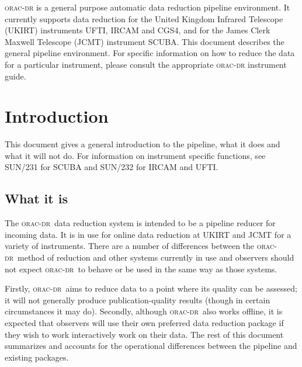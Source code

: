 \documentclass[twoside,11pt]{article}
\newcommand{\stardocinitials}  {SUN}
\newcommand{\stardocnumber}    {230.2}
\newcommand{\stardocabstract}  {\textsc{orac-dr} is a general purpose
automatic data reduction pipeline environment. It currently supports data
reduction for the United Kingdom Infrared Telescope (UKIRT) instruments UFTI,
 IRCAM and CGS4, and for the James Clerk Maxwell Telescope (JCMT) instrument
SCUBA. This document describes the general pipeline environment. For specific
information on how to reduce the data for a particular instrument, please
consult the appropriate \textsc{orac-dr} instrument guide.}
\newcommand{\stardocname}{\stardocinitials /\stardocnumber}
\newenvironment{latexonly}{}{}
\renewcommand{\_}{\texttt{\symbol{95}}}
\newcommand{\oracdr}{\textsc{orac-dr}}
\renewcommand{\thepage}{\roman{page}}
\begin{document}
\stardocabstract
  \newpage
  \begin{latexonly}
    \setlength{\parskip}{0mm}
    \tableofcontents
    \setlength{\parskip}{\medskipamount}
    \markboth{\stardocname}{\stardocname}
  \end{latexonly}
\cleardoublepage
\renewcommand{\thepage}{\arabic{page}}
\setcounter{page}{1}


\section{Introduction\label{Introduction_to_ORAC-DR}}

This document gives a general introduction to the pipeline, what it
does and what it will not do. For information on instrument
specific functions, see SUN/231 for SCUBA and SUN/232 for IRCAM and UFTI.

\subsection*{What it is\label{Introduction_to_ORAC-DR_What_it_is}}

The \oracdr\ data reduction system is intended to be a pipeline reducer
for incoming data. It is in use for online data reduction at UKIRT and
JCMT for a variety of instruments. There are a number of differences
between the \oracdr\ method of reduction and other systems currently in
use and observers should not expect \oracdr\ to behave or be used in
the same way as those systems.



Firstly, \oracdr\ aims to reduce data to a point where its quality can
be assessed; it will not generally produce publication-quality results
(though in certain circumstances it may do).  Secondly, although
\oracdr\ also works offline, it is expected that observers will use
their own preferred data reduction package if they wish to work
interactively work on their data. The rest of this document summarizes
and accounts for the operational differences between the pipeline and
existing packages.
\end{document}
